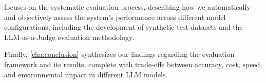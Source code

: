  focuses on the systematic evaluation process, describing how we automatically and objectively assess the system's performance across different model configurations, including the development of synthetic test datasets and the LLM-as-a-Judge evaluation methodology.

Finally, \cref{cha:conclusion} synthesizes our findings regarding the evaluation framework and its results, complete with trade-offs between accuracy, cost, speed, and environmental impact in different LLM models.

